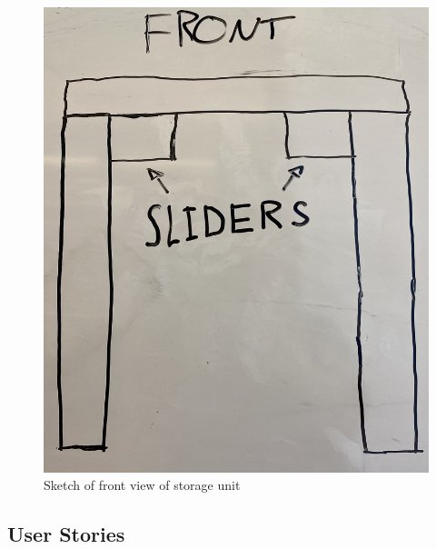 \documentclass{article}
\begin{document}
\begin{figure}[tb]
\vskip 3mm
\begin{center}
\begin{small}
\begin{sc}
\centerline{\includegraphics[width=0.5\columnwidth]{figs/front.jpeg}}
\caption{Sketch of front view of storage unit}
\label{Front view}
\end{sc}
\end{small}
\end{center}
\vskip -3mm
\end{figure} 

\subsection{User Stories}
\end{document}
